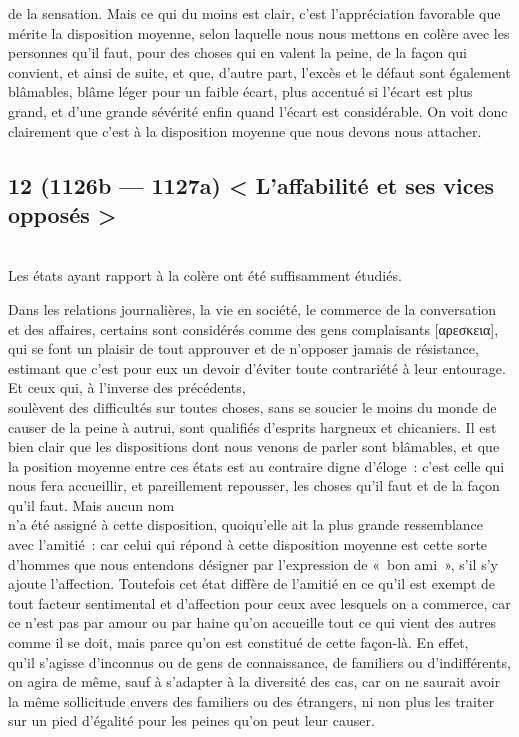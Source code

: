 \documentclass[french,twoside]{book} %
\begin{document}
de la sensation. Mais ce qui du moins est clair, c’est l’appréciation favorable que mérite la disposition moyenne, selon laquelle nous nous mettons en colère avec les personnes qu’il faut, pour des choses qui en valent la peine, de la façon qui convient, et ainsi de suite, et que, d’autre part, l’excès et le défaut sont également blâmables, blâme léger pour un faible écart, plus accentué si l’écart est plus grand, et d’une grande sévérité enfin quand l’écart est considérable. On voit donc clairement que c’est à la disposition moyenne que nous devons nous attacher.
\subsection[{12 (1126b — 1127a) < L’affabilité et ses vices opposés >}]{12 (1126b — 1127a) < L’affabilité et ses vices opposés >}
\noindent \\
Les états ayant rapport à la colère ont été suffisamment étudiés.\par
Dans les relations journalières, la vie en société, le commerce de la conversation et des affaires, certains sont considérés comme des gens complaisants [αρεσκεια], qui se font un plaisir de tout approuver et de n’opposer jamais de résistance, estimant que c’est pour eux un devoir d’éviter toute contrariété à leur entourage. Et ceux qui, à l’inverse des précédents, \\
soulèvent des difficultés sur toutes choses, sans se soucier le moins du monde de causer de la peine à autrui, sont qualifiés d’esprits hargneux et chicaniers. Il est bien clair que les dispositions dont nous venons de parler sont blâmables, et que la position moyenne entre ces états est au contraire digne d’éloge : c’est celle qui nous fera accueillir, et pareillement repousser, les choses qu’il faut et de la façon qu’il faut. Mais aucun nom \\
n’a été assigné à cette disposition, quoiqu’elle ait la plus grande ressemblance avec l’amitié : car celui qui répond à cette disposition moyenne est cette sorte d’hommes que nous entendons désigner par l’expression de « bon ami », s’il s’y ajoute l’affection. Toutefois cet état diffère de l’amitié en ce qu’il est exempt de tout facteur sentimental et d’affection pour ceux avec lesquels on a commerce, car ce n’est pas par amour ou par haine qu’on accueille tout ce qui vient des autres comme il se doit, mais parce qu’on est constitué de cette façon-là. En effet, \\
qu’il s’agisse d’inconnus ou de gens de connaissance, de familiers ou d’indifférents, on agira de même, sauf à s’adapter à la diversité des cas, car on ne saurait avoir la même sollicitude envers des familiers ou des étrangers, ni non plus les traiter sur un pied d’égalité pour les peines qu’on peut leur causer.\par
\end{document}
